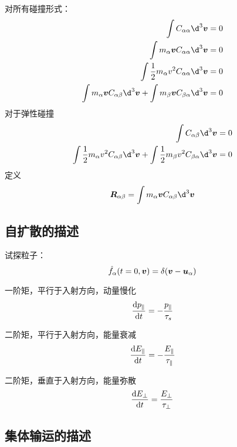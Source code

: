 对所有碰撞形式：
\begin{subequations}\begin{align}
\int C_{\alpha\alpha} \d^3\vector{v} &= 0 \\
\int m_\alpha\vector{v} C_{\alpha\alpha} \d^3\vector{v} &= 0 \\
\int \frac{1}{2} m_\alpha v^2 C_{\alpha\alpha} \d^3\vector{v} &= 0 \\
\int m_\alpha\vector{v} C_{\alpha\beta} \d^3\vector{v}
+ \int m_\beta\vector{v} C_{\beta\alpha} \d^3\vector{v}&= 0
\end{align}\end{subequations}
对于弹性碰撞
\begin{subequations}\begin{align}
\int C_{\alpha\beta} \d^3\vector{v} &= 0\\
\int \frac{1}{2} m_\alpha v^2 C_{\alpha\beta} \d^3\vector{v}
+ \int \frac{1}{2} m_\beta v^2 C_{\beta\alpha} \d^3\vector{v} &= 0
\end{align}\end{subequations}
定义
\begin{equation}
\vector{R}_{\alpha\beta} = \int m_\alpha\vector{v} C_{\alpha\beta} \d^3\vector{v}
\end{equation}

\subsection{自扩散的描述}

试探粒子：
\begin{equation}
\hat{f}_\alpha(t=0,\bm{v})=\delta(\bm{v}-\bm{u}_\alpha)
\end{equation}

一阶矩，平行于入射方向，动量慢化
\begin{equation}
\odv{p_\parallel}{t} = - \frac{p_\parallel}{\tau_s}
\end{equation}

二阶矩，平行于入射方向，能量衰减
\begin{equation}
\odv{E_\parallel}{t} = - \frac{E_\parallel}{\tau_\parallel}
\end{equation}

二阶矩，垂直于入射方向，能量弥散
\begin{equation}
\odv{E_\perp}{t} = \frac{E_\perp}{\tau_\perp}
\end{equation}

\subsection{集体输运的描述}

